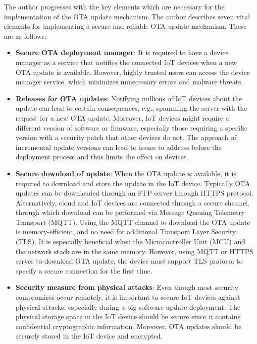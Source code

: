 \documentclass[12pt,a4paper]{article}
\begin{document}
The author progresses with the key elements which are necessary for the implementation of the OTA update mechanism. The author describes seven vital elements for implementing a secure and reliable OTA update mechanism. These are as follows: 

\begin{itemize}

\item \textbf{Secure OTA deployment manager}: It is required to have a device manager as a service that notifies the connected IoT devices when a new OTA update is available. However, highly trusted users can access the device manager service, which minimizes unnecessary errors and malware threats. \cite{r27}

\item \textbf{Releases for OTA updates}: Notifying millions of IoT devices about the update can lead to certain consequences, e.g., spamming the server with the request for a new OTA update. Moreover, IoT devices might require a different version of software or firmware, especially those requiring a specific version with a security patch that other devices do not. The approach of incremental update versions can lead to issues to address before the deployment process and thus limits the effect on devices. \cite{r27}

\item \textbf{Secure download of update}: When the OTA update is available, it is required to download and store the update in the IoT device. Typically OTA updates can be downloaded through an FTP server through HTTPS protocol. Alternatively, cloud and IoT devices are connected through a secure channel, through which download can be performed via Message Queuing Telemetry Transport (MQTT). Using the MQTT channel to download the OTA update is memory-efficient, and no need for additional Transport Layer Security (TLS). It is especially beneficial when the Microcontroller Unit (MCU) and the network stack are in the same memory. However, using MQTT or HTTPS server to download OTA update, the device must support TLS protocol to specify a secure connection for the first time. \cite{r27}

\item \textbf{Security measure from physical attacks}: Even though most security compromises occur remotely, it is important to secure IoT devices against physical attacks, especially during a big software update deployment. The physical storage space in the IoT device should be secure since it contains confidential cryptographic information. Moreover, OTA updates should be securely stored in the IoT device and encrypted. \cite{r27}


\end{itemize}
\end{document}
